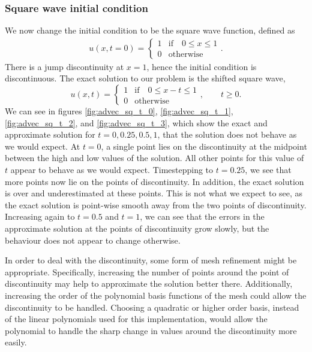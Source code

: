 \subsubsection{Square wave initial condition}

We now change the initial condition to be the square wave function, defined as
\begin{align}
	u(x,t=0) = \begin{cases}
		1 & \text{if}\quad 0 \leq x \leq 1 \\
        0 & \text{otherwise}
	\end{cases}. \label{eq:square}
\end{align}
There is a jump discontinuity at $x=1$, hence the initial condition is discontinuous.
The exact solution to our problem is the shifted square wave,
\[
u(x,t) = \begin{cases}
		1 & \text{if}\quad 0 \leq x-t \leq 1 \\
        0 & \text{otherwise}
	\end{cases}, \qquad t \geq 0.
\]
We can see in figures \ref{fig:advec_sq_t_0}, \ref{fig:advec_sq_t_1}, \ref{fig:advec_sq_t_2}, and \ref{fig:advec_sq_t_3}, which show the exact and approximate solution for $t=0, 0.25, 0.5, 1$, that the solution does not behave as we would expect.
At $t=0$, a single point lies on the discontinuity at the midpoint between the high and low values of the solution.
All other points for this value of $t$ appear to behave as we would expect.
Timestepping to $t=0.25$, we see that more points now lie on the points of discontinuity.
In addition, the exact solution is over and underestimated at these points.
This is not what we expect to see, as the exact solution is point-wise smooth away from the two points of discontinuity.
Increasing again to $t=0.5$ and $t=1$, we can see that the errors in the approximate solution at the points of discontinuity grow slowly, but the behaviour does not appear to change otherwise.

In order to deal with the discontinuity, some form of mesh refinement might be appropriate.
Specifically, increasing the number of points around the point of discontinuity may help to approximate the solution better there.
Additionally, increasing the order of the polynomial basis functions of the mesh could allow the discontinuity to be handled.
Choosing a quadratic or higher order basis, instead of the linear polynomials used for this implementation, would allow the polynomial to handle the sharp change in values around the discontinuity more easily. 


